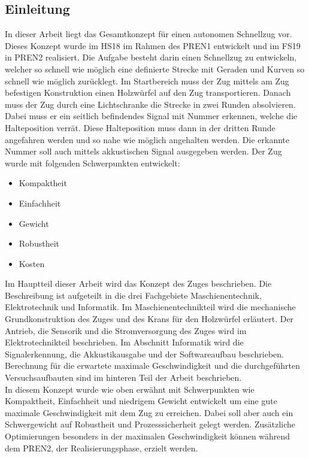 \documentclass[../../main.tex]{subfiles}
\begin{document}
\subsection{Einleitung}
In dieser Arbeit liegt das Gesamtkonzept für einen autonomen Schnellzug vor. Dieses Konzept wurde im HS18 im Rahmen des PREN1 entwickelt und im FS19 in PREN2 realisiert. Die Aufgabe besteht darin einen Schnellzug zu entwickeln, welcher so schnell wie möglich eine definierte Strecke mit Geraden und Kurven so schnell wie möglich zurücklegt. Im Startbereich muss der Zug mittels am Zug befestigen Konstruktion einen Holzwürfel auf den Zug transportieren. Danach muss der Zug durch eine Lichtschranke die Strecke in zwei Runden absolvieren. Dabei muss er ein seitlich befindendes Signal mit Nummer erkennen, welche die Halteposition verrät. Diese Halteposition muss dann in der dritten Runde angefahren werden und so nahe wie möglich angehalten werden. Die erkannte Nummer soll auch mittels akkustischen Signal ausgegeben werden. Der Zug wurde mit folgenden Schwerpunkten entwickelt:
\begin{itemize}
    \item Kompaktheit
    \item Einfachheit
    \item Gewicht
    \item Robustheit
    \item Kosten
\end{itemize}
Im Hauptteil dieser Arbeit wird das Konzept des Zuges beschrieben. Die Beschreibung ist aufgeteilt in die drei Fachgebiete Maschienentechnik, Elektrotechnik und Informatik. Im Maschienentechnikteil wird die mechanische Grundkonstruktion des Zuges und des Krans für den Holzwürfel erläutert. Der Antrieb, die Sensorik und die Stromversorgung des Zuges wird im Elektrotechnikteil beschrieben. Im Abschnitt Informatik wird die Signalerkennung, die Akkustikausgabe und der Softwareaufbau beschrieben. Berechnung für die erwartete maximale Geschwindigkeit und die durchgeführten Versuchsaufbauten sind im hinteren Teil der Arbeit beschrieben.\\
In diesem Konzept wurde wie oben erwähnt mit Schwerpunkten wie Kompaktheit, Einfachheit und niedrigem Gewicht entwickelt um eine gute maximale Geschwindigkeit mit dem Zug zu erreichen. Dabei soll aber auch ein Schwergewicht auf Robustheit und Prozesssicherheit gelegt werden. Zusätzliche Optimierungen besonders in der maximalen Geschwindigkeit können während dem PREN2, der Realisierungsphase, erzielt werden.
\pagebreak
\end{document}
